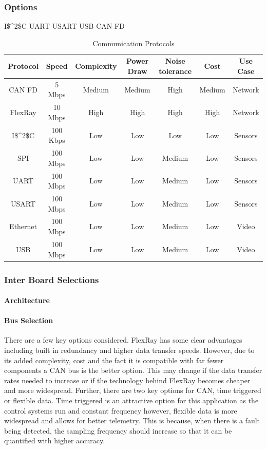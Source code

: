 \subsubsection{Options}
\gls{I$^2$C}
\gls{UART}
\gls{USART}
\gls{USB}
\gls{CAN FD}
\begin{table}[]
        \centering
        \begin{tabular}{|c|c|c|c|c|c|c|} 
         \textbf{Protocol} & \textbf{Speed} & \textbf{Complexity} &\textbf{Power Draw} &\textbf{Noise tolerance} &\textbf{Cost} & \textbf{Use Case}\\
         \hline
         \gls{CAN FD} & 5 Mbps & Medium & Medium  & High & Medium & Network\\
         FlexRay   & 10 Mbps & High & High  & High & High & Network\\
         \gls{I$^2$C} & 100 Kbps & Low & Low & Low & Low & Sensors\\
         \gls{SPI} & 100 Mbps & Low & Low & Medium & Low & Sensors\\
         \gls{UART} & 100 Mbps & Low & Low & Medium & Low & Sensors\\
         \gls{USART} & 100 Mbps & Low & Low & Medium & Low & Sensors\\
          Ethernet & 100 Mbps & Low & Low & Medium & Low & Video\\
         \gls{USB} & 100 Mbps & Low & Low & Medium & Low & Video\\
         \hline
        \end{tabular}
        \caption{Communication Protocols}
        \label{tab:communication_options}
    \end{table}
\subsubsection{Inter Board Selections}
\paragraph{Architecture}
\paragraph{Bus Selection}
There are a few key options considered. FlexRay has some clear advantages including built in redundancy and higher data transfer speeds. However, due to its added complexity, cost and the fact it is compatible with far fewer components a \gls{CAN} bus is the better option. This may change if the data transfer rates needed to increase or if the technology behind FlexRay becomes cheaper and more widespread. Further, there are two key options for \gls{CAN}, time triggered or flexible data. Time triggered is an attractive option for this application as the control systems run and constant frequency however, flexible data is more widespread and allows for better telemetry. This is because, when there is a fault being detected, the sampling frequency should increase so that it can be quantified with higher accuracy.
